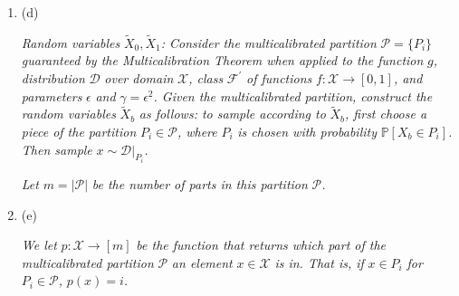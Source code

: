 \documentclass[10pt,a4paper]{article}
\begin{document}
\begin{enumerate}
\emph{We then define the randomized function }$g$\emph{ as:}\par


\[\begin{gathered}
g(x)=\begin{cases}0\nobreak\ \nobreak\ \text{with probability }\frac{\mathbb{P}[X_{0}=x]}{\mathbb{P}[X_{0}=x]+\mathbb{P}[X_{1}=x]}\\
1\nobreak\ \nobreak\ \text{with probability }\frac{\mathbb{P}[X_{1}=x]}{\mathbb{P}[X_{0}=x]+\mathbb{P}[X_{1}=x]}.\end{cases}
\end{gathered}\]





\item[] 
(d) 


\emph{Random variables }$\widetilde{X}_{0},\widetilde{X}_{1}$\emph{: Consider the multicalibrated partition }$\mathcal{P}=\{P_{i}\}$\emph{ guaranteed by the Multicalibration Theorem when applied to the function }$g$\emph{, distribution }$\mathcal{D}$\emph{ over domain }$\mathcal{X}$\emph{, class }$\mathcal{F}^{\prime}$\emph{ of functions }$f:\mathcal{X}\to[0,1]$\emph{, and parameters }$\epsilon$\emph{ and }$\gamma=\epsilon^{2}$\emph{. Given the multicalibrated partition, construct the random variables }$\widetilde{X}_{b}$\emph{ as follows: to sample according to }$\widetilde{X}_{b}$\emph{, first choose a piece of the partition }$P_{i}\in\mathcal{P}$\emph{, where }$P_{i}$\emph{ is chosen with probability }$\mathbb{P}[X_{b}\in P_{i}]$\emph{. Then sample }$x\sim\mathcal{D}|_{P_{i}}$\emph{.}\par




\emph{Let }$m=|\mathcal{P}|$\emph{ be the number of parts in this partition }$\mathcal{P}$\emph{.}\par





\item[] 
(e) 


\emph{We let }$p:\mathcal{X}\to[m]$\emph{ be the function that returns which part of the multicalibrated partition }$\mathcal{P}$\emph{ an element }$x\in\mathcal{X}$\emph{ is in. That is, if }$x\in P_{i}$\emph{ for }$P_{i}\in\mathcal{P}$\emph{, }$p(x)=i$\emph{.}\par





\end{enumerate}
\end{document}
